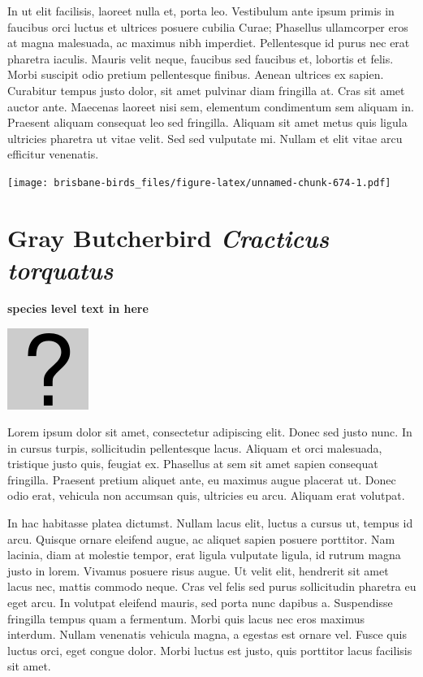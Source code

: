 \documentclass[]{book}
\let\origfigure\figure
\let\endorigfigure\endfigure
\renewenvironment{figure}[1][2] {
  \expandafter\origfigure\expandafter[H]
} {
  \endorigfigure
}
\begin{document}
In ut elit facilisis, laoreet nulla et, porta leo. Vestibulum ante ipsum
primis in faucibus orci luctus et ultrices posuere cubilia Curae;
Phasellus ullamcorper eros at magna malesuada, ac maximus nibh
imperdiet. Pellentesque id purus nec erat pharetra iaculis. Mauris velit
neque, faucibus sed faucibus et, lobortis et felis. Morbi suscipit odio
pretium pellentesque finibus. Aenean ultrices ex sapien. Curabitur
tempus justo dolor, sit amet pulvinar diam fringilla at. Cras sit amet
auctor ante. Maecenas laoreet nisi sem, elementum condimentum sem
aliquam in. Praesent aliquam consequat leo sed fringilla. Aliquam sit
amet metus quis ligula ultricies pharetra ut vitae velit. Sed sed
vulputate mi. Nullam et elit vitae arcu efficitur venenatis.

\begin{figure}
\centering
\texttt{[image: brisbane-birds\_files/figure-latex/unnamed-chunk-674-1.pdf]}
\caption{\label{fig:unnamed-chunk-674}insert figure caption}
\end{figure}

\section{\texorpdfstring{Gray Butcherbird \emph{Cracticus
torquatus}}{Gray Butcherbird Cracticus torquatus}}\label{gray-butcherbird-cracticus-torquatus}

\textbf{species level text in here}

\begin{figure}
\centering
\includegraphics{assets/missing.png}
\caption{No image for species}
\end{figure}

Lorem ipsum dolor sit amet, consectetur adipiscing elit. Donec sed justo
nunc. In in cursus turpis, sollicitudin pellentesque lacus. Aliquam et
orci malesuada, tristique justo quis, feugiat ex. Phasellus at sem sit
amet sapien consequat fringilla. Praesent pretium aliquet ante, eu
maximus augue placerat ut. Donec odio erat, vehicula non accumsan quis,
ultricies eu arcu. Aliquam erat volutpat.

In hac habitasse platea dictumst. Nullam lacus elit, luctus a cursus ut,
tempus id arcu. Quisque ornare eleifend augue, ac aliquet sapien posuere
porttitor. Nam lacinia, diam at molestie tempor, erat ligula vulputate
ligula, id rutrum magna justo in lorem. Vivamus posuere risus augue. Ut
velit elit, hendrerit sit amet lacus nec, mattis commodo neque. Cras vel
felis sed purus sollicitudin pharetra eu eget arcu. In volutpat eleifend
mauris, sed porta nunc dapibus a. Suspendisse fringilla tempus quam a
fermentum. Morbi quis lacus nec eros maximus interdum. Nullam venenatis
vehicula magna, a egestas est ornare vel. Fusce quis luctus orci, eget
congue dolor. Morbi luctus est justo, quis porttitor lacus facilisis sit
amet.
\end{document}
